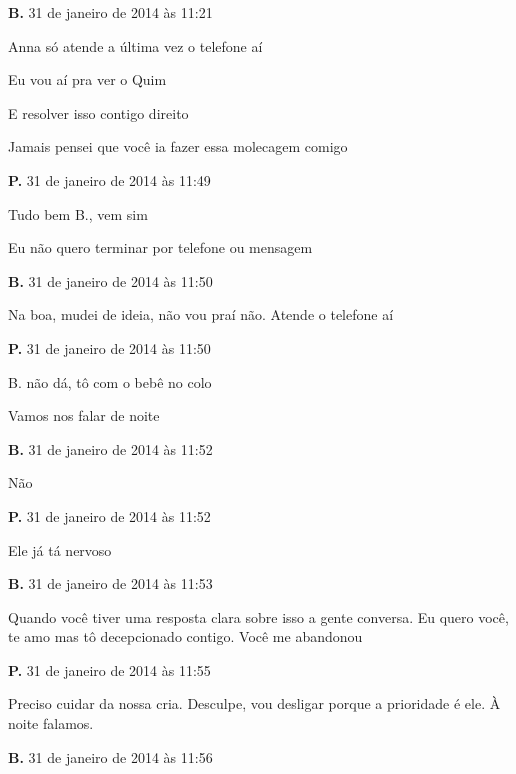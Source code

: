 {{{\parindent0pt\parskip1pt\raggedright
\textbf{B.} 31 de janeiro de 2014 às 11:21

Anna só atende a última vez o telefone aí

Eu vou aí pra ver o Quim

E resolver isso contigo direito

Jamais pensei que você ia fazer essa molecagem comigo

\textbf{P.} 31 de janeiro de 2014 às 11:49

Tudo bem B., vem sim

Eu não quero terminar por telefone ou mensagem

\textbf{B.} 31 de janeiro de 2014 às 11:50

Na boa, mudei de ideia, não vou praí não. Atende o telefone aí

\textbf{P.} 31 de janeiro de 2014 às 11:50

B. não dá, tô com o bebê no colo

Vamos nos falar de noite

\textbf{B.} 31 de janeiro de 2014 às 11:52

Não

\textbf{P.} 31 de janeiro de 2014 às 11:52

Ele já tá nervoso

\textbf{B.} 31 de janeiro de 2014 às 11:53

Quando você tiver uma resposta clara sobre isso a gente conversa. Eu
quero você, te amo mas tô decepcionado contigo. Você me abandonou

\textbf{P.} 31 de janeiro de 2014 às 11:55

Preciso cuidar da nossa cria. Desculpe, vou desligar porque a prioridade
é ele. À noite falamos.

\textbf{B.} 31 de janeiro de 2014 às 11:56
}

}}
